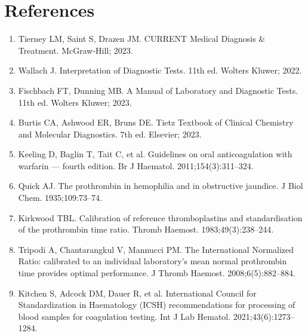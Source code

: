 \section*{References}
\begin{enumerate}
  \item Tierney LM, Saint S, Drazen JM. CURRENT Medical Diagnosis \& Treatment. McGraw-Hill; 2023.
  \item Wallach J. Interpretation of Diagnostic Tests. 11th ed. Wolters Kluwer; 2022.
  \item Fischbach FT, Dunning MB. A Manual of Laboratory and Diagnostic Tests. 11th ed. Wolters Kluwer; 2023.
  \item Burtis CA, Ashwood ER, Bruns DE. Tietz Textbook of Clinical Chemistry and Molecular Diagnostics. 7th ed. Elsevier; 2023.
  \item Keeling D, Baglin T, Tait C, et al. Guidelines on oral anticoagulation with warfarin --- fourth edition. Br J Haematol. 2011;154(3):311--324.
  \item Quick AJ. The prothrombin in hemophilia and in obstructive jaundice. J Biol Chem. 1935;109:73--74.
  \item Kirkwood TBL. Calibration of reference thromboplastins and standardisation of the prothrombin time ratio. Thromb Haemost. 1983;49(3):238--244.
  \item Tripodi A, Chantarangkul V, Mannucci PM. The International Normalized Ratio: calibrated to an individual laboratory's mean normal prothrombin time provides optimal performance. J Thromb Haemost. 2008;6(5):882--884.
  \item Kitchen S, Adcock DM, Dauer R, et al. International Council for Standardization in Haematology (ICSH) recommendations for processing of blood samples for coagulation testing. Int J Lab Hematol. 2021;43(6):1273--1284.
\end{enumerate}

\clearpage

